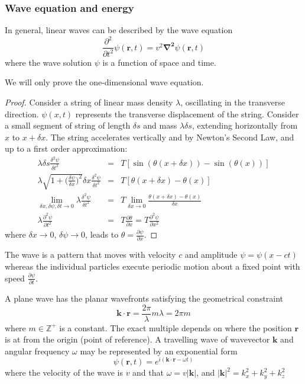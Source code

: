 \documentclass[a4paper]{article}
\begin{document}
\subsubsection*{Wave equation and energy}
\begin{thm}
In general, linear waves can be described by the wave equation
$$\frac{\partial^2}{\partial t^2}\psi(\mathbf{r},t)=v^2\boldsymbol{\nabla^2}\psi(\mathbf{r},t)$$
where the wave solution $\psi$ is a function of space and time.
\end{thm}
We will only prove the one-dimensional wave equation.
\begin{proof}
Consider a string of linear mass density $\lambda$, oscillating in the transverse direction. $\psi(x,t)$ represents the transverse displacement of the string. Consider a small segment of string of length $\delta s$ and mass $\lambda\delta s$, extending horizontally from $x$ to $x+\delta x$. The string accelerates vertically and by Newton's Second Law, and up to a first order approximation:
\begin{eqnarray}
\lambda\delta s\frac{\delta^2\psi}{\delta t^2}&=&T[\sin(\theta(x+\delta x))-\sin(\theta(x))]\nonumber\\\lambda\sqrt{1+\bigg(\frac{\delta \psi}{\delta x}\bigg)^2}\delta x\frac{\delta^2\psi}{\delta t^2}&=&T[\theta(x+\delta x)-\theta(x)]\nonumber\\\lim_{\delta x,\delta\psi,\delta t\rightarrow 0}\lambda\frac{\delta^2\psi}{\delta t^2}&=&T\lim_{\delta x\rightarrow0}\frac{\theta(x+\delta x)-\theta(x)}{\delta x}\nonumber\\\lambda\frac{\partial^2\psi}{\partial t^2}&=&T\frac{\partial\theta}{\partial x}=T\frac{\partial^2\psi}{\partial x^2}\nonumber
\end{eqnarray}
where $\delta x\rightarrow0$, $\delta \psi\rightarrow 0$, leads to $\theta=\frac{\partial\psi}{\partial x}$.
\end{proof}
\begin{defi}
The wave is a pattern that moves with velocity $c$ and amplitude $\psi = \psi(x−ct)$
whereas the individual particles execute periodic motion about a fixed
point with speed $\frac{\partial\psi}{\partial t}$.
\end{defi}
\begin{defi}
A plane wave has the planar wavefronts satisfying the geometrical constraint
$$\mathbf{k}\cdot\mathbf{r}=\frac{2\pi}{\lambda}m\lambda=2\pi m$$
where $m\in\mathbb{Z}^+$ is a constant. The exact multiple depends on where the position $\mathbf{r}$ is at from the origin (point of reference). A travelling wave of wavevector $\mathbf{k}$ and angular frequency $\omega$ may be represented by an exponential form
$$\psi(\mathbf{r},t)=e^{i(\mathbf{k}\cdot\mathbf{r}-\omega t)}$$
where the velocity of the wave is $v$ and that $\omega=v|\mathbf{k}|$, and $|\mathbf{k}|^2=k_x^2+k_y^2+k_z^2$
\end{defi}
\end{document}
